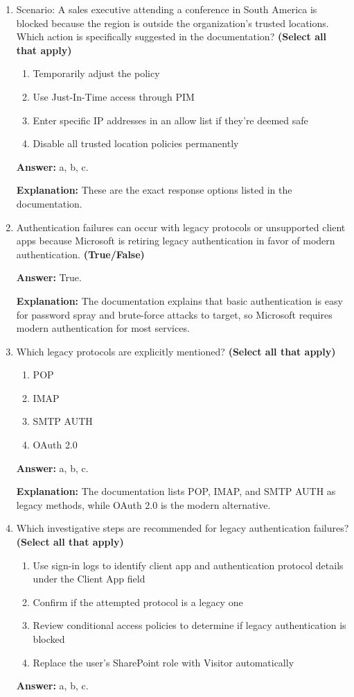 \documentclass[10pt]{article}
\begin{document}
\begin{enumerate}[leftmargin=*]
\textbf{Explanation:} All four steps are listed in the location/IP troubleshooting scenario.

\item Scenario: A sales executive attending a conference in South America is blocked because the region is outside the organization’s trusted locations. Which action is specifically suggested in the documentation? \textbf{(Select all that apply)}
\begin{enumerate}[label=\alph*., leftmargin=1.5em]
\item Temporarily adjust the policy
\item Use Just-In-Time access through PIM
\item Enter specific IP addresses in an allow list if they’re deemed safe
\item Disable all trusted location policies permanently
\end{enumerate}
\textbf{Answer:} a, b, c.

\textbf{Explanation:} These are the exact response options listed in the documentation.

\item Authentication failures can occur with legacy protocols or unsupported client apps because Microsoft is retiring legacy authentication in favor of modern authentication. \textbf{(True/False)}

\textbf{Answer:} True.

\textbf{Explanation:} The documentation explains that basic authentication is easy for password spray and brute-force attacks to target, so Microsoft requires modern authentication for most services.

\item Which legacy protocols are explicitly mentioned? \textbf{(Select all that apply)}
\begin{enumerate}[label=\alph*., leftmargin=1.5em]
\item POP
\item IMAP
\item SMTP AUTH
\item OAuth 2.0
\end{enumerate}
\textbf{Answer:} a, b, c.

\textbf{Explanation:} The documentation lists POP, IMAP, and SMTP AUTH as legacy methods, while OAuth 2.0 is the modern alternative.

\item Which investigative steps are recommended for legacy authentication failures? \textbf{(Select all that apply)}
\begin{enumerate}[label=\alph*., leftmargin=1.5em]
\item Use sign-in logs to identify client app and authentication protocol details under the Client App field
\item Confirm if the attempted protocol is a legacy one
\item Review conditional access policies to determine if legacy authentication is blocked
\item Replace the user’s SharePoint role with Visitor automatically
\end{enumerate}
\textbf{Answer:} a, b, c.


\end{enumerate}
\end{document}
